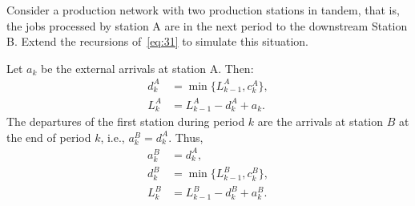 \begin{exercise}
 Consider a production network with two production stations in tandem, that is, the jobs processed by station A are in the next period to the downstream Station B.
 Extend the recursions of~\cref{eq:31} to simulate this situation.
\begin{solution}
 Let $a_k$ be the external arrivals at station A. Then:
\begin{equation}
 \begin{split}
 d^A_k &= \min\{L_{k-1}^A, c_k^A\}, \\
 L_k^A &= L_{k-1}^A -d_k^A + a_k.
 \end{split}
\end{equation}
The departures of the first station during period $k$ are the arrivals
at station $B$ at the end of period $k$, i.e., $a_k^B =
d_{k}^A$. Thus,
\begin{equation}
 \begin{split}
 a_k^B &= d_{k}^A,\\
 d^B_k &= \min\{L_{k-1}^B, c_k^B\}, \\
 L_k^B &= L_{k-1}^B -d_k^B + a_k^B.
 \end{split}
\end{equation}
\end{solution}
\end{exercise}

